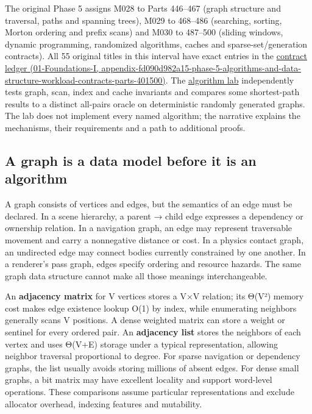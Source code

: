 The original Phase 5 assigns M028 to Parts 446--467 (graph structure and traversal, paths and spanning trees), M029 to 468--486 (searching, sorting, Morton ordering and prefix scans) and M030 to 487--500 (sliding windows, dynamic programming, randomized algorithms, caches and sparse-set/generation contracts). All 55 original titles in this interval have exact entries in the \href{../01-Foundations-I/main.pdf\#nameddest=appendix-fd090d982a15-phase-5-algorithms-and-data-structure-workload-contracts-parts-401500}{contract ledger (01-Foundations-I, appendix-fd090d982a15-phase-5-algorithms-and-data-structure-workload-contracts-parts-401500)}. The \href{tools/labs/phase5_algorithm_workload_lab.cpp}{algorithm lab} independently tests graph, scan, index and cache invariants and compares some shortest-path results to a distinct all-pairs oracle on deterministic randomly generated graphs. The lab does not implement every named algorithm; the narrative explains the mechanisms, their requirements and a path to additional proofs.

\subsection{A graph is a data model before it is an algorithm}\label{05-engine-i-ch008-a-graph-is-a-data-model-before-it-is-an-algorithm}

A graph consists of vertices and edges, but the semantics of an edge must be declared. In a scene hierarchy, a parent → child edge expresses a dependency or ownership relation. In a navigation graph, an edge may represent traversable movement and carry a nonnegative distance or cost. In a physics contact graph, an undirected edge may connect bodies currently constrained by one another. In a renderer's pass graph, edges specify ordering and resource hazards. The same graph data structure cannot make all those meanings interchangeable.

An \textbf{adjacency matrix} for V vertices stores a V×V relation; its Θ(V²) memory cost makes edge existence lookup O(1) by index, while enumerating neighbors generally scans V positions. A dense weighted matrix can store a weight or sentinel for every ordered pair. An \textbf{adjacency list} stores the neighbors of each vertex and uses Θ(V+E) storage under a typical representation, allowing neighbor traversal proportional to degree. For sparse navigation or dependency graphs, the list usually avoids storing millions of absent edges. For dense small graphs, a bit matrix may have excellent locality and support word-level operations. These comparisons assume particular representations and exclude allocator overhead, indexing features and mutability.

